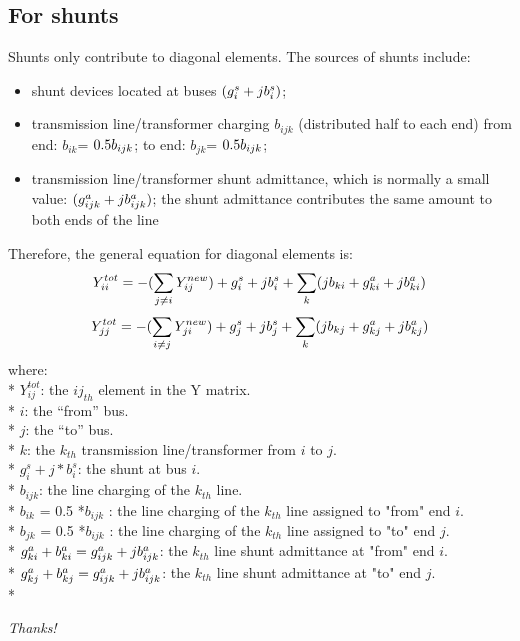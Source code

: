 \documentclass[12pt]{article}
\begin{document}
\subsection*{For shunts}
Shunts only contribute to diagonal elements. The sources of shunts include:
\begin{itemize}
\item shunt devices located at buses $(g_{i}^{s}+j\*b_{i}^{s})$;
\item transmission line/transformer charging $b_{ijk}$ (distributed half to each end)
     from end: $b_{ik}$= $0.5\*b_{ijk}$;
     to end: $b_{jk}$= $0.5\*b_{ijk}$;
\item transmission line/transformer shunt admittance, which is normally a small
value: $(g_{ijk}^{a}+j\*b_{ijk}^{a})$; the shunt admittance contributes the same
amount to both ends of the line
\end{itemize}
Therefore, the general equation for diagonal elements is:
\begin{equation}
Y_{ii}^{tot} = - (\sum_{j\ne i} Y_{ij}^{new})
+ g_{i}^{s}+j\*b_{i}^{s}
 + \sum_k (j\*b_{ki} + g_{ki}^{a}+j\*b_{ki}^{a})
\end{equation} 
\begin{equation}
Y_{jj}^{tot} = - (\sum_{i\ne j} Y_{ji}^{new})
 + g_{j}^{s}+j\*b_{j}^{s}
 + \sum_k (j\*b_{kj} + g_{kj}^{a}+j\*b_{kj}^{a})
\end{equation} 
where:\\*
$Y_{ij}^{tot}$: the ${ij}_{th}$ element in the Y matrix.\\* 
$i$: the ``from'' bus. \\*
$j$: the ``to'' bus. \\*
$k$: the $k_{th}$ transmission line/transformer from $i$ to $j$. \\*
$g_{i}^{s}+j*b_{i}^{s}$: the shunt at bus $i$. \\*
$b_{ijk}$: the line charging of the $k_{th}$ line. \\*
$b_{ik}$ = 0.5 *$b_{ijk}$ : the line charging of the $k_{th}$ line assigned to "from" end $i$. \\*
$b_{jk}$ = 0.5 *$b_{ijk}$ : the line charging of the $k_{th}$ line assigned to "to" end $j$. \\*
$g_{ki}^{a}+b_{ki}^{a} = g_{ijk}^{a}+j\*b_{ijk}^{a}$: the $k_{th}$ line shunt admittance at "from" end $i$. \\*
$g_{kj}^{a}+b_{kj}^{a} = g_{ijk}^{a}+j\*b_{ijk}^{a}$: the $k_{th}$ line shunt admittance at "to" end $j$. \\*


\begin{center}
\textit{Thanks!}
\end{center}
\end{document}
